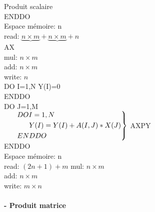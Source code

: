 \documentclass{article}
\begin{document}
    Produit scalaire\\
    ENDDO\\
    Espace mémoire: n\\
    read: $\underbrace{n\times m}+\underbrace{n\times m}+n$\\
    \hspace*{1.2cm}A\hspace*{1.1cm}X\\
    mul: $n\times m$\\
    add: $n\times m$\\
    write: $n$\\
    DO I=1,N
    \hspace*{0.6cm}Y(I)=0\\
    ENDDO\\
    DO J=1,M\\
    $\begin{rcases}
        \hspace*{0.6cm}DO I=1,N\\
        \hspace*{1.2cm}Y(I)=Y(I)+A(I,J)*X(J)\\
        \hspace*{0.6cm}ENDDO
    \end{rcases}$
    AXPY\\
    ENDDO\\
    Espace mémoire: n\\
    read: $(2n+1)+m$
    mul: $n\times m$\\
    add: $n\times m$\\
    write: $m\times n$\\\\
    \textbf{- Produit matrice}\\
\end{document}
